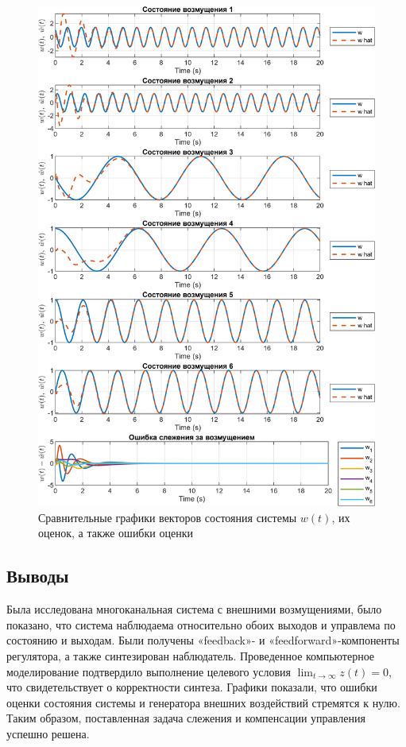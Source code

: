 \begin{figure}[H]
    \centering
    \includegraphics[width=\linewidth]{figs/2fig2.png}
    \caption{Сравнительные графики векторов состояния системы $w(t)$,
    их оценок, а также ошибки оценки}
    \label{fig:2fig2}
\end{figure}

\subsection{Выводы}

Была исследована многоканальная система с внешними 
возмущениями, было показано, что система наблюдаема относительно обоих выходов и 
управлема по состоянию и выходам. 
Были получены «feedback»- и «feedforward»-компоненты регулятора, а также 
синтезирован наблюдатель. Проведенное компьютерное моделирование подтвердило 
выполнение целевого условия $\lim_{t\rightarrow\infty}z(t)=0$, что свидетельствует 
о корректности синтеза. Графики показали, что ошибки оценки состояния системы и 
генератора внешних воздействий стремятся к нулю. 
Таким образом, поставленная задача слежения и компенсации управления успешно решена.



